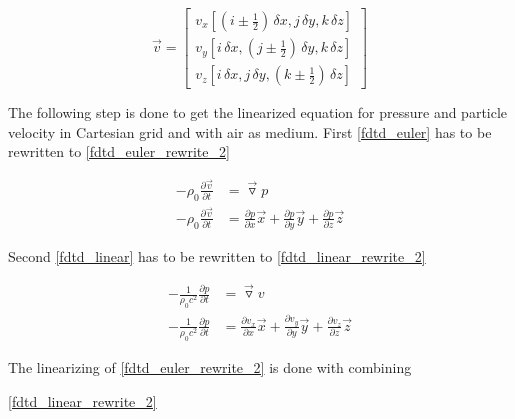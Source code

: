 \begin{equation}\label{fdtd_component}
\vec{v}= \begin{bmatrix}
v_x[(i\pm \frac{1}{2})\,\delta x,j\,\delta y,k\,\delta z]\\
v_y[i\,\delta x,(j\pm \frac{1}{2})\,\delta y,k\,\delta z]\\
v_z[i\,\delta x,j\,\delta y,(k\pm \frac{1}{2})\,\delta z]
\end{bmatrix}
\end{equation}

The following step is done to get the linearized equation for pressure and particle velocity in Cartesian grid and with air as medium. First \autoref{fdtd_euler} has to be rewritten to \autoref{fdtd_euler_rewrite_2}


\begin{subequations}\label{fdtd_euler_rewrite}
\begin{alignat}{2}
-\rho_0 \frac{\partial \vec{v}}{\partial t} &=\vec{\triangledown }p \label{fdtd_euler_rewrite_1}\\
-\rho_0 \frac{\partial \vec{v}}{\partial t} &=\frac{\partial p}{\partial x}\vec{x}+\frac{\partial p}{\partial y}\vec{y}+\frac{\partial p}{\partial z}\vec{z} \label{fdtd_euler_rewrite_2}
\end{alignat}
\end{subequations}


Second \autoref{fdtd_linear} has to be rewritten to \autoref{fdtd_linear_rewrite_2}

\begin{subequations}\label{fdtd_linear_rewrite}
\begin{alignat}{2}
- \frac{1}{\rho_0c^2} \frac{\partial p}{\partial t} &=\vec{\triangledown }v \label{fdtd_linear_rewrite_1}\\
- \frac{1}{\rho_0c^2} \frac{\partial p}{\partial t} &=\frac{\partial v_x}{\partial x}\vec{x}+\frac{\partial v_y}{\partial y}\vec{y}+\frac{\partial v_z}{\partial z}\vec{z}\label{fdtd_linear_rewrite_2}
\end{alignat}
\end{subequations}

The linearizing of \autoref{fdtd_euler_rewrite_2} is done with combining  




\autoref{fdtd_linear_rewrite_2} 



